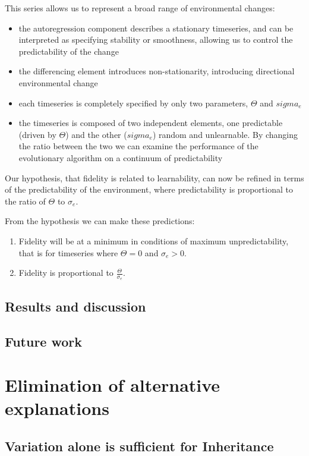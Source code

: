 \documentclass[]{report}
\begin{document}
This series allows us to represent a broad range of environmental changes:

\begin{itemize}
	\item the autoregression component describes a stationary timeseries, and can be interpreted as specifying stability or smoothness, allowing us to control the predictability of the change
	\item the differencing element introduces non-stationarity, introducing directional environmental change
	\item each timeseries is completely specified by only two parameters, $\Theta$ and $sigma_e$
	\item the timeseries is composed of two independent elements, one predictable (driven by $\Theta$) and the other ($sigma_e$) random and unlearnable. By changing the ratio between the two we can examine the performance of the evolutionary algorithm on a continuum of predictability
\end{itemize}

Our hypothesis, that fidelity is related to learnability, can now be refined in terms of the predictability of the environment, where predictability is proportional to the ratio of $\Theta$ to $\sigma_e$.

From the hypothesis we can make these predictions:
\begin{enumerate}
	\item Fidelity will be at a minimum in conditions of maximum unpredictability, that is for timeseries where $\Theta=0$ and $\sigma_e>0$.
	\item Fidelity is proportional to $\frac{\Theta}{\sigma_e}$.
\end{enumerate}
	
\section{Results and discussion}
\section{Future work}

\chapter{Elimination of alternative explanations}
\section{Variation alone is sufficient for Inheritance}
\end{document}
